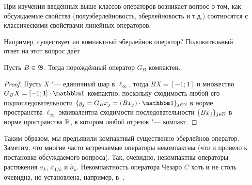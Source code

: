 При изучении введённых выше классов операторов возникает вопрос о том,
как обсуждаемые свойства (полуэберлейновость, эберлейновость и т.д.)
соотносятся с классическими свойствами линейных операторов.

Например, существует ли компактный эберлейнов оператор?
Положительный ответ на этот вопрос даёт

\begin{theorem}
	Пусть $B\in\mathfrak{B}$.
	Тогда порождённый оператор $G_B$ компактен.
\end{theorem}

\begin{proof}
	Пусть $X$ "--- единичный шар в $\ell_\infty$,
	тогда $BX = [-1;1]$
	и множество $G_B X = [-1;1] \cdot \one$
	компактно,
	поскольку сходимость любой его подпоследовательности $\{y_j = G_B x_j = (Bx_j) \cdot \one\}_{j\in\N}$
	в норме пространства $\ell_\infty$ эквивалентна сходимости последовательности
	$\{Bx_j\}_{j\in\mathbb{N}}$ в норме пространства $\mathbb{R}$,
	в котором любой отрезок "--- компакт.
\end{proof}

Таким образом, мы предъявили компактный существенно эберлейнов оператор.
Заметим, что многие часто встречаемые операторы некомпактны
(что и привело к постановке обсуждаемого вопроса).
Так, очевидно, некомпактны операторы растяжения $\sigma_k$, $\sigma_{1/k}$ и $\tilde\sigma_k$.
Некомпактность оператора Чезаро $C$ хоть и не столь очевидна, но установлена, например, в~\cite[Theorem 4.4]{ALALAM20181038}.
